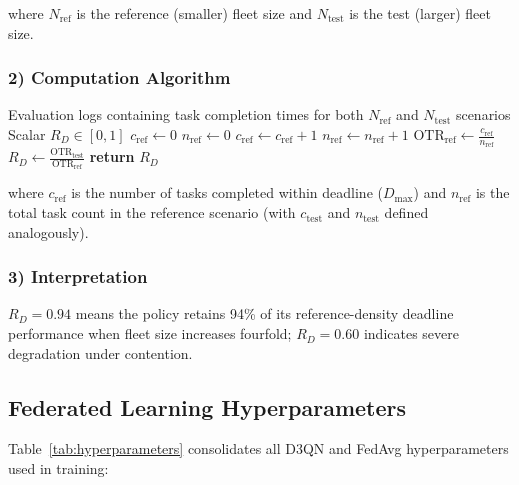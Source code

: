 \documentclass[journal,10pt,twocolumn]{IEEEtran}
\begin{document}
where $N_{\text{ref}}$ is the reference (smaller) fleet size and $N_{\text{test}}$ is the test (larger) fleet size.

\subsubsection*{2) Computation Algorithm}

\begin{algorithm}
\caption{Deadline Retention Ratio Computation}
\label{alg:drr}
\begin{algorithmic}[1]
\REQUIRE Evaluation logs containing task completion times for both $N_{\text{ref}}$ and $N_{\text{test}}$ scenarios
\ENSURE Scalar $R_D \in [0, 1]$
\STATE $c_{\text{ref}} \gets 0$
\STATE $n_{\text{ref}} \gets 0$
    \STATE $c_{\text{ref}} \gets c_{\text{ref}} + 1$
  \ENDIF
  \STATE $n_{\text{ref}} \gets n_{\text{ref}} + 1$
\ENDFOR
\STATE $\text{OTR}_{\text{ref}} \gets \frac{c_{\text{ref}}}{n_{\text{ref}}}$
\STATE $R_D \gets \frac{\text{OTR}_{\text{test}}}{\text{OTR}_{\text{ref}}}$
\STATE \textbf{return} $R_D$
\end{algorithmic}
\end{algorithm}

\noindent where $c_{\text{ref}}$ is the number of tasks completed within deadline ($D_{\max}$) and $n_{\text{ref}}$ is the total task count in the reference scenario (with $c_{\text{test}}$ and $n_{\text{test}}$ defined analogously).

\subsubsection*{3) Interpretation}
$R_D = 0.94$ means the policy retains 94\% of its reference-density deadline performance when fleet size increases fourfold; $R_D = 0.60$ indicates severe degradation under contention.

\subsection{Federated Learning Hyperparameters}

Table~\ref{tab:hyperparameters} consolidates all D3QN and FedAvg hyperparameters used in training:
\end{document}
